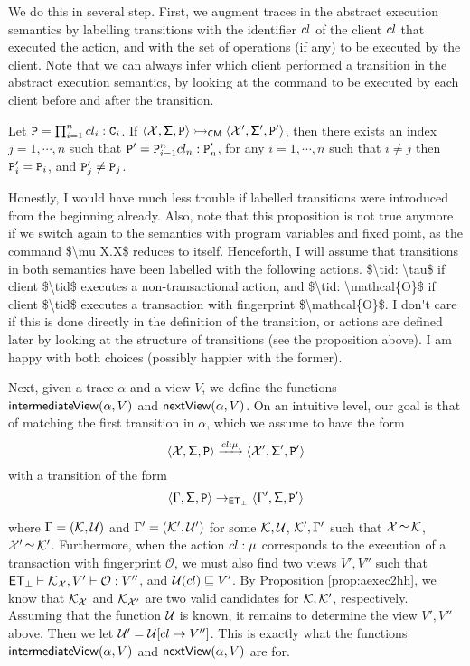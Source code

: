 We do this in several step. 
First, we augment traces in the abstract execution semantics by labelling transitions 
with the identifier $\tid$ of the client $\tid$ that executed the action, 
and with the set of operations (if any) to be executed by the client. 
Note that we can always infer which client performed a transition 
in the abstract execution semantics, by looking at the command 
to be executed by each client before and after the transition.
\begin{proposition}
Let $\texttt{P} = \prod_{i = 1}^{n} cl_{i}: \texttt{C}_{i}$. 
If $\langle \mathcal{X}, \mathsf{\Sigma}, \texttt{P} \rangle \rightarrowtail_{\mathsf{CM}} 
\langle \mathcal{X}', \mathsf{\Sigma}', \texttt{P}' \rangle$, then there exists 
an index $j=1,\cdots, n$ such that $\texttt{P}' = 
\texttt{P}_{i=1}^{n} cl_{n}: \texttt{P}'_{n}$, for any $i =1,\cdots, n$ 
such that $i \neq j$ then $\texttt{P}'_{i} = \texttt{P}_{i}$, and $\texttt{P}'_{j} \neq \texttt{P}_{j}$.
\end{proposition}
\ac{Honestly, I would have much less trouble if labelled 
transitions were introduced from the beginning 
already. Also, note that this proposition is not true anymore if we switch 
again to the semantics with program variables and fixed point, as the command 
$\mu X.X$ reduces to itself.}
\ac{Henceforth, I will assume that transitions in both semantics have been labelled 
with the following actions. $\tid: \tau$ if client $\tid$ executes a non-transactional 
action, and $\tid: \mathcal{O}$ if client $\tid$ executes a transaction with fingerprint 
$\mathcal{O}$. I don't care if this is done directly in the definition of the transition, 
or actions are defined later by looking at the structure of transitions (see the proposition 
above). I am happy with both choices (possibly happier with the former).}

Next, given a trace $\alpha$ and a view $V$, 
we define the functions $\mathsf{intermediateView}(\alpha, V)$ and $\mathsf{nextView}(\alpha, V)$. 
On an intuitive level, our goal is that of matching the  
first transition in $\alpha$, which we assume to have the form 
\[
\langle \mathcal{X}, \mathsf{\Sigma}, \texttt{P} \rangle \xrightarrow{cl: \mu} \langle \mathcal{X}', \mathsf{\Sigma}', \texttt{P}' \rangle
\]
 with a transition of the form 
\[
\langle \Gamma, \mathsf{\Sigma}, \texttt{P} \rangle \rightarrow_{\mathsf{ET}_{\bot}} \langle \Gamma', \mathsf{\Sigma}, \texttt{P}' \rangle
\]
 
where $\Gamma = (\mathcal{K}, \mathcal{U})$ and $\Gamma' = (\mathcal{K}', \mathcal{U}')$ 
for some $\mathcal{K}, \mathcal{U}$, $\mathcal{K}', \Gamma'$ such that 
$\mathcal{X} \mathop{\simeq} \mathcal{K}$, $\mathcal{X}' \mathop{\simeq} \mathcal{K}'$. 
Furthermore, when the action $cl: \mu$ corresponds to the execution of a transaction 
with fingerprint $\mathcal{O}$, we must also find two views $V', V''$ such that 
$\mathsf{ET}_{\bot} \vdash \mathcal{K}_{\mathcal{X}}, V' \vdash \mathcal{O} : V''$, 
and $\mathcal{U}(cl) \sqsubseteq V'$.
By Proposition \ref{prop:aexec2hh}, we know that $\mathcal{K}_{\mathcal{X}}$ and 
$\mathcal{K}_{\mathcal{X}'}$ are two valid candidates for $\mathcal{K}, \mathcal{K}'$, respectively. 
Assuming that the function $\mathcal{U}$ is known, it remains to 
determine the view $V', V''$ above. Then we let 
$\mathcal{U}' = \mathcal{U}[ cl \mapsto V'']$.
This is exactly what the functions $\mathsf{intermediateView}(\alpha, V)$ 
and $\mathsf{nextView}(\alpha, V)$ are for.

